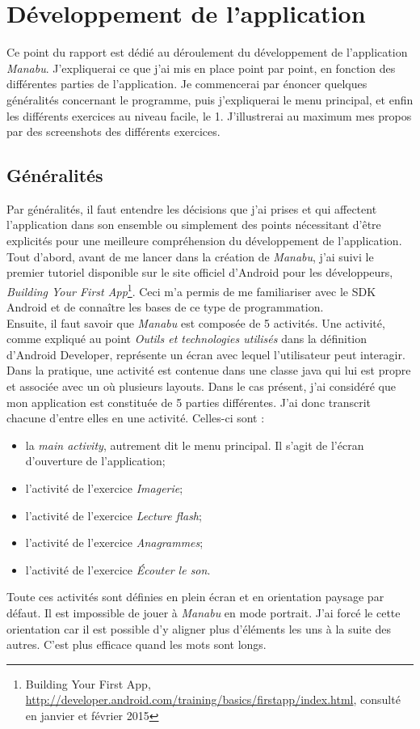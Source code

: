 \section{Développement de l'application}
Ce point du rapport est dédié au déroulement du développement de l'application \textit{Manabu}. J'expliquerai ce que j'ai mis en place point par point, en fonction des différentes parties de l'application. Je commencerai par énoncer quelques généralités concernant le programme, puis j'expliquerai le menu principal, et enfin les différents exercices au niveau facile, le 1. J'illustrerai au maximum mes propos par des screenshots des différents exercices.

\subsection{Généralités}
Par généralités, il faut entendre les décisions que j'ai prises et qui affectent l'application dans son ensemble ou simplement des points nécessitant d'être explicités pour une meilleure compréhension du développement de l'application.\\

Tout d'abord, avant de me lancer dans la création de \textit{Manabu}, j'ai suivi le premier tutoriel disponible sur le site officiel d'Android pour les développeurs, \textit{Building Your First App}\footnote{Building Your First App, \url{http://developer.android.com/training/basics/firstapp/index.html}, consulté en janvier et février 2015}. Ceci m'a permis de me familiariser avec le SDK Android et de connaître les bases de ce type de programmation.\\

Ensuite, il faut savoir que \textit{Manabu} est composée de 5 activités. Une activité, comme expliqué au point \textit{Outils et technologies utilisés} dans la définition d'Android Developer, représente un écran avec lequel l'utilisateur peut interagir. Dans la pratique, une activité est contenue dans une classe java qui lui est propre et associée avec un où plusieurs layouts. Dans le cas présent, j'ai considéré que mon application est constituée de 5 parties différentes. J'ai donc transcrit chacune d'entre elles en une activité. Celles-ci sont :
\begin{itemize}
\item la \textit{main activity}, autrement dit le menu principal. Il s'agit de l'écran d'ouverture de l'application;
\item l'activité de l'exercice \textit{Imagerie};
\item l'activité de l'exercice \textit{Lecture flash};
\item l'activité de l'exercice \textit{Anagrammes};
\item l'activité de l'exercice \textit{Écouter le son}.
\end{itemize}
Toute ces activités sont définies en plein écran et en orientation paysage par défaut. Il est impossible de jouer à \textit{Manabu} en mode portrait. J'ai forcé le cette orientation car il est possible d'y aligner plus d'éléments les uns à la suite des autres. C'est plus efficace quand les mots sont longs.\\

